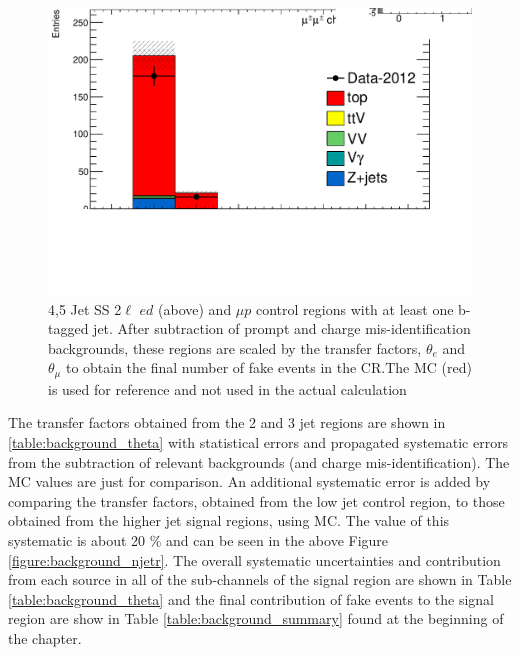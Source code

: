 \begin{figure}[htbp]
\begin{minipage}[h]{0.5\textwidth}
  \end{minipage}\hfill
  \begin{minipage}[h]{0.5\textwidth}
    \centering \includegraphics[width=\textwidth]{figs/fake/TaT-23jets-1b_nb_mm}
  \end{minipage}\hfill

  \caption{4,5 Jet SS 2$\ell$  $ed$ (above) and $\mu p$ control regions with at least one b-tagged jet. After subtraction of prompt and charge mis-identification backgrounds, these regions
    are scaled by the transfer factors, $\theta_e$ and $\theta_{\mu}$ to obtain the final number of fake events in the CR.The \ttbar MC (red) is
  used for reference and not used in the actual calculation}
  \label{figure:background_45jets}
 \end{figure}

The transfer factors obtained from the 2 and 3 jet regions are shown in \ref{table:background_theta} with statistical errors and propagated systematic
errors from the subtraction of relevant backgrounds (\ttV and charge mis-identification). The MC values are just for comparison. An additional 
systematic error is added by comparing the transfer factors, obtained from the low jet control region, to those obtained from the 
higher jet signal regions, using \ttbar MC. The value of this systematic is about 20 \% and can be seen in the above Figure \ref{figure:background_njetr}.
The overall systematic uncertainties and contribution from each source in all of the sub-channels of the signal region are shown in Table \ref{table:background_theta}
and the final contribution of fake events to the signal region are show in Table \ref{table:background_summary} found at the beginning of the chapter.  

